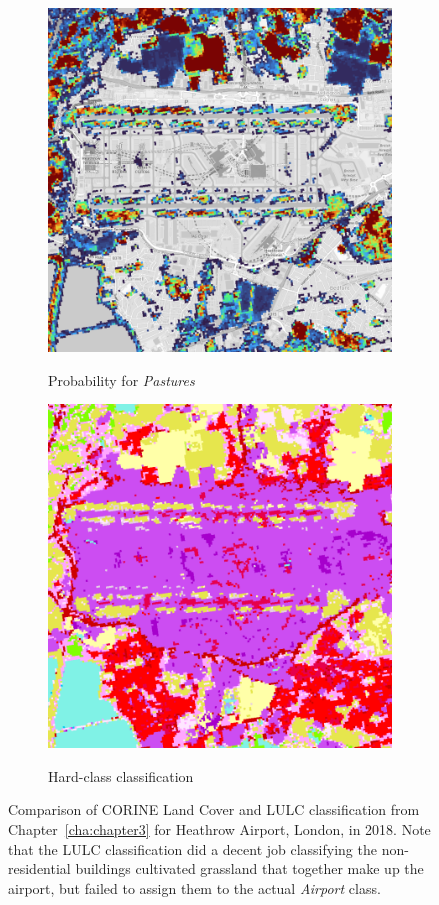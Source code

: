 \begin{figure}[H]
\begin{subfigure}[b]{0.48\textwidth}
        \end{subfigure}
        \vspace{0.5em}
        \begin{subfigure}[b]{0.48\textwidth}
        \centering
        \caption{Probability for \textit{Pastures}}
        \includegraphics[width=\textwidth,height=0.7\textwidth]{figs_06/heathrow_p_pastures.png}
        \label{fig:heathrow_industrial-commercial}
        \end{subfigure}
        \hfill
        \begin{subfigure}[b]{0.48\textwidth}
        \centering
        \caption{Hard-class classification}
        \includegraphics[width=\textwidth,height=0.7\textwidth]{figs_06/heathrow_lulc.png}
        \label{fig:heathrow_industrial-commercial}
        \end{subfigure}
        \label{fig:airport_grass}
        \caption{Comparison of CORINE Land Cover and LULC classification from Chapter\@~\ref{cha:chapter3} for Heathrow Airport, London, in 2018. Note that the LULC classification did a decent job classifying the non-residential buildings cultivated grassland that together make up the airport, but failed to assign them to the actual \textit{Airport} class.}
        \end{figure}

